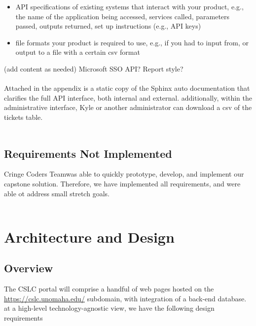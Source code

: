 \documentclass[oneside,openany,obeyspaces]{book}
\newcommand\tab[1][1cm]{\hspace*{#1}}
\newcommand\TeamName{Cringe Coders Team}
\begin{document}
\begin{flushleft}
    \begin{itemize}
        \item API specifications of existing systems that interact with your product, e.g., the name of the application being accessed, services called, parameters passed, outputs returned, set up instructions (e.g., API keys)
        \item file formats your product is required to use, e.g., if you had to input from, or output to a file with a certain csv format
    \end{itemize}

    \tab (add content as needed) Microsoft SSO API? Report style?\\~\\

    \tab Attached in the appendix is a static copy of the Sphinx auto documentation that clarifies the full API interface, both internal and external. additionally, within the administrative interface, Kyle or another administrator can download a csv of the tickets table.\\~\\


    \section{Requirements Not Implemented}

    \tab \TeamName was able to quickly prototype, develop, and implement our capstone solution. Therefore, we have implemented all requirements, and were able ot address small stretch goals.\\~\\




    \chapter{Architecture and Design} \label{chp:Architecture and Design}

    \section{Overview}

    \tab The CSLC portal will comprise a handful of web pages hosted on the \url{https://cslc.unomaha.edu/} subdomain, with integration of a back-end database. at a high-level technology-agnostic view, we have the following design requirements\\~\\


\end{flushleft}
\end{document}
